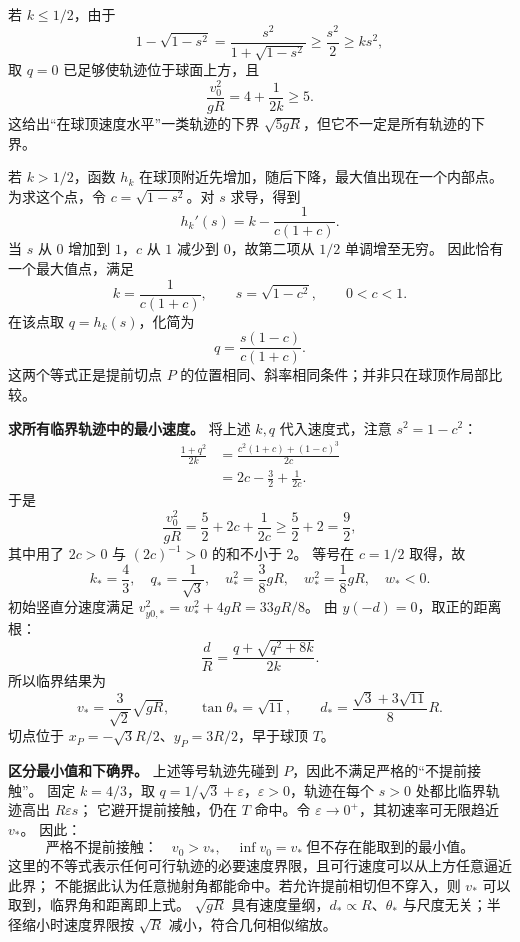 {\begin{xesolution}
若 $k\le1/2$，由于
\[
 1-\sqrt{1-s^2}=\frac{s^2}{1+\sqrt{1-s^2}}\ge\frac{s^2}{2}\ge ks^2,
\]
取 $q=0$ 已足够使轨迹位于球面上方，且
\[
 \frac{v_0^2}{gR}=4+\frac1{2k}\ge5.
\]
这给出“在球顶速度水平”一类轨迹的下界 $\sqrt{5gR}$，但它不一定是所有轨迹的下界。

若 $k>1/2$，函数 $h_k$ 在球顶附近先增加，随后下降，最大值出现在一个内部点。
为求这个点，令 $c=\sqrt{1-s^2}$。对 $s$ 求导，得到
\[
 h_k'(s)=k-\frac1{c(1+c)}.
\]
当 $s$ 从 $0$ 增加到 $1$，$c$ 从 $1$ 减少到 $0$，故第二项从 $1/2$ 单调增至无穷。
因此恰有一个最大值点，满足
\[
 k=\frac1{c(1+c)},\qquad s=\sqrt{1-c^2},\qquad 0<c<1.
\]
在该点取 $q=h_k(s)$，化简为
\[
 q=\frac{s(1-c)}{c(1+c)}.
\]
这两个等式正是提前切点 $P$ 的位置相同、斜率相同条件；并非只在球顶作局部比较。

\textbf{求所有临界轨迹中的最小速度。}
将上述 $k,q$ 代入速度式，注意 $s^2=1-c^2$：
\begin{align*}
 \frac{1+q^2}{2k}
 &=\frac{c^2(1+c)+(1-c)^3}{2c}\\
 &=2c-\frac32+\frac1{2c}.
\end{align*}
于是
\[
 \frac{v_0^2}{gR}
 =\frac52+2c+\frac1{2c}\ge\frac52+2=\frac92,
\]
其中用了 $2c>0$ 与 $(2c)^{-1}>0$ 的和不小于 $2$。
等号在 $c=1/2$ 取得，故
\[
 k_*=\frac43,\quad q_*=\frac1{\sqrt3},\quad
 u_*^2=\frac38gR,\quad w_*^2=\frac18gR,\quad w_*<0.
\]
初始竖直分速度满足 $v_{y0,*}^2=w_*^2+4gR=33gR/8$。
由 $y(-d)=0$，取正的距离根：
\[
 \frac{d}{R}=\frac{q+\sqrt{q^2+8k}}{2k}.
\]
所以临界结果为
\[
 \boxed{v_*=\frac3{\sqrt2}\sqrt{gR}},\qquad
 \boxed{\tan\theta_*=\sqrt{11}},\qquad
 \boxed{d_*=\frac{\sqrt3+3\sqrt{11}}8R}.
\]
切点位于 $x_P=-\sqrt3R/2$、$y_P=3R/2$，早于球顶 $T$。

\textbf{区分最小值和下确界。}
上述等号轨迹先碰到 $P$，因此不满足严格的“不提前接触”。
固定 $k=4/3$，取 $q=1/\sqrt3+\varepsilon$，$\varepsilon>0$，轨迹在每个 $s>0$ 处都比临界轨迹高出 $R\varepsilon s$；
它避开提前接触，仍在 $T$ 命中。令 $\varepsilon\to0^+$，其初速率可无限趋近 $v_*$。
因此：
\[
 \boxed{\text{严格不提前接触：}\quad v_0>v_*,
 \quad \inf v_0=v_*\ \text{但不存在能取到的最小值。}}
\]
这里的不等式表示任何可行轨迹的必要速度界限，且可行速度可以从上方任意逼近此界；
不能据此认为任意抛射角都能命中。若允许提前相切但不穿入，则 $v_*$ 可以取到，临界角和距离即上式。
$\sqrt{gR}$ 具有速度量纲，$d_*\propto R$、$\theta_*$ 与尺度无关；半径缩小时速度界限按 $\sqrt R$ 减小，符合几何相似缩放。
\end{xesolution}
}

